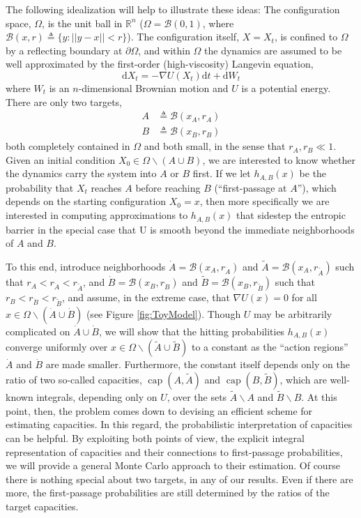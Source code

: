 \documentclass[nofootinbib,english, aip, jcp, priprint, graphicx,floatfix]{revtex4-1}
\theoremstyle{plain}
\theoremstyle{definition}
\theoremstyle{plain}
\newcommand{\capac}[2]{\ensuremath{\operatorname{cap}}(#1,#2)}
\newcommand{\bb}[1]{\mathcal{B}\left(#1\right)}
\newcommand{\dA}{{\dot A}}
\newcommand{\tA}{{\tilde A}}
\newcommand{\dB}{{\dot B}}
\newcommand{\tB}{{\tilde B}}
\begin{document}
The following idealization will help to illustrate these ideas: The configuration space,
$\Omega$, is the unit ball in $\mathbb{R}^n$
($\Omega = \bb{0,1}$, where $\bb{x, r} \triangleq \{ y : || y - x || < r \}$). The configuration itself, $X=X_t$, is confined to $\Omega$ by a reflecting boundary at $\partial\Omega$, and within $\Omega$ the dynamics are assumed to be well approximated by the first-order (high-viscosity) Langevin equation,
\begin{equation} 
\label{equ:toy_sde}
\mathrm{d} X_t = - \nabla U (X_t) \mathrm{d} t + \mathrm{d} W_t 
\end{equation}
where $W_t$ is an $n$-dimensional Brownian motion and 
$U$ is a potential energy. There are only two targets, 
\begin{align*}
A &\triangleq \bb {x_A, r_A}\\
B &\triangleq \bb {x_B, r_B}
\end{align*}
both completely contained in $\Omega$ and both small, in the sense that $r_A,r_B \ll 1$.
Given an initial condition $X_0\in \Omega \backslash (A\cup B)$, we are interested to know whether the dynamics carry the system into $A$ or $B$ first.  If we let $h_{A,B}(x)$ be the probability that $X_t$ reaches $A$ before reaching $B$ (``first-passage at $A$''), which depends on the starting configuration $X_0=x$, then more specifically we are interested in computing approximations to $h_{A,B}(x)$ that sidestep the entropic barrier in the special case that U is smooth beyond the immediate neighborhoods of $A$ and $B$.

To this end, introduce neighborhoods $\dA=\bb{x_A,r_\dA }$ and $\tA=\bb{x_A,r_\tA }$ such that $r_A<r_\dA<r_\tA$, and
$\dB=\bb{x_B,r_\dB }$ and $\tB=\bb{x_B,r_\tB }$ such that $r_B<r_\dB<r_\tB$, and assume, in the extreme case,  that $\nabla U(x)=0$ for all $x\in\Omega\backslash (\dA\cup\dB)$
(see Figure \ref{fig:ToyModel}). 
Though $U$ may be arbitrarily complicated on $\dA \cup \dB$, we will show that the hitting probabilities $h_{A,B}(x)$ converge uniformly over $x\in \Omega \backslash (\tA\cup \tB)$ to a constant as the ``action regions'' $\dA$ and $\dB$ are made smaller.
Furthermore, the constant itself depends only on the ratio of
two so-called capacities, $\capac{A}{\tA}$ and $\capac{B}{\tB}$, which are well-known integrals, depending only on $U$, over the sets $\tA\backslash A$ and $\tB\backslash B$.
At this point, then, the problem comes down to devising an efficient scheme for estimating capacities. 
In this regard, the probabilistic interpretation of capacities can be helpful. By exploiting both points of view, the explicit integral representation of capacities and their connections to first-passage probabilities, we will provide a general Monte Carlo approach to their estimation. 
Of course there is nothing special about two targets, in any of our results. Even if there are more, the first-passage probabilities are still determined by the ratios of the target capacities. 
\end{document}
